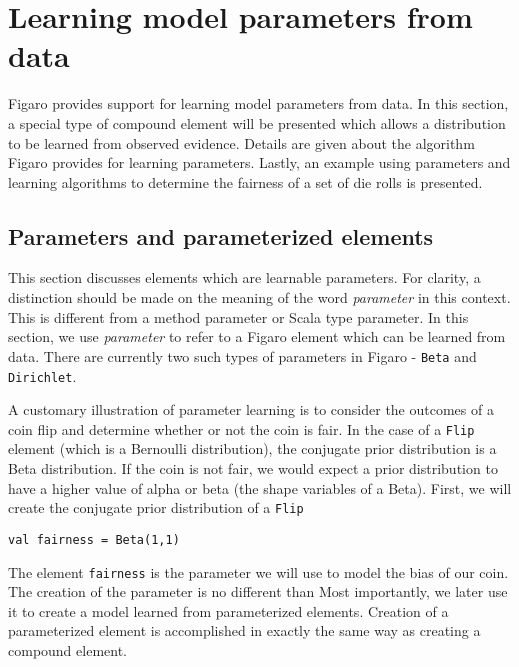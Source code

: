 
\chapter{Learning model parameters from data} %

\label{Learning model parameters from data} %

Figaro provides support for learning model parameters from data. In this section, a special type of compound element will be presented which allows a distribution to be learned from observed evidence. Details are given about the algorithm Figaro provides for learning parameters. Lastly, an example using parameters and learning algorithms to determine the fairness of a set of die rolls is presented.

\section{Parameters and parameterized elements}

This section discusses elements which are learnable parameters. For clarity, a distinction should be made on the meaning of the word \emph{parameter} in this context. This is different from a method parameter or Scala type parameter. In this section, we use \emph{parameter} to refer to a Figaro element which can be learned from data. There are currently two such types of parameters in Figaro - \texttt{Beta} and \texttt{Dirichlet}.

A customary illustration of parameter learning is to consider the outcomes of a coin flip and determine whether or not the coin is fair. In the case of a \texttt{Flip} element (which is a Bernoulli distribution), the conjugate prior distribution is a Beta distribution. If the coin is not fair, we would expect a prior distribution to have a higher value of alpha or beta (the shape variables of a Beta). First, we will create the conjugate prior distribution of a \texttt{Flip}

\begin{flushleft}
\texttt{val fairness = Beta(1,1)}
\end{flushleft}

The element \texttt{fairness} is the parameter we will use to model the bias of our coin. The creation of the parameter is no different than  Most importantly, we later use it to create a model learned from parameterized elements. Creation of a parameterized element is accomplished in exactly the same way as creating a compound element.

